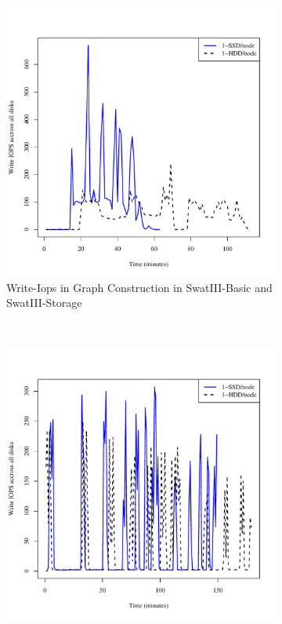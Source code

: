 \documentclass[conference]{IEEEtran}
\begin{document}
\begin{figure}[htb]
\begin{subfigure}[b]{0.3\textwidth}
                \includegraphics[width=\textwidth]{Figure/SystemData/Plots/BGHddSsdWrIops.pdf}
                \caption{Write-Iops in Graph Construction in SwatIII-Basic and SwatIII-Storage}
                \label{fig:BGHddSsdWrIops}
        \end{subfigure}
        ~ %
        \begin{subfigure}[b]{0.3\textwidth}
                \includegraphics[width=\textwidth]{Figure/SystemData/Plots/ECHddSsdWrIops.pdf}

\end{subfigure}
\end{figure}
\end{document}
